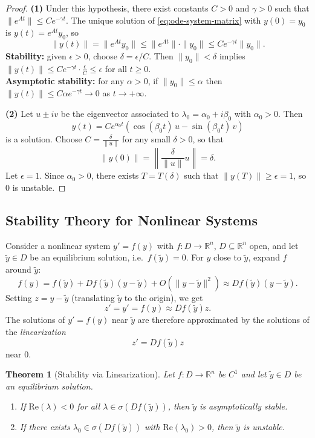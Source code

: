 \documentclass{article}
\newtheorem{theorem}{Theorem}
\newcommand{\R}{\mathbb{R}}
\begin{document}
\begin{proof}
    \textbf{(1)} Under this hypothesis, there exist constants 
    $C > 0$ and $\gamma > 0$ such that $\|e^{At}\| \leq 
    Ce^{-\gamma t}$. The unique solution of 
    \eqref{eq:ode-system-matrix} with $y(0) = y_0$ is 
    $y(t) = e^{At}y_0$, so
    \[\|y(t)\| = \|e^{At}y_0\| \leq \|e^{At}\|\cdot\|y_0\| 
    \leq Ce^{-\gamma t}\|y_0\|.\]
    \textbf{Stability:} given $\epsilon > 0$, choose 
    $\delta = \epsilon/C$. Then $\|y_0\| < \delta$ implies 
    $\|y(t)\| \leq Ce^{-\gamma t}\cdot\frac{\epsilon}{C} \leq 
    \epsilon$ for all $t \geq 0$.\\
    \textbf{Asymptotic stability:} for any $\alpha > 0$, if 
    $\|y_0\| \leq \alpha$ then 
    $\|y(t)\| \leq C\alpha e^{-\gamma t} \to 0$ as $t \to +\infty$.

    \textbf{(2)} Let $u \pm iv$ be the eigenvector associated to 
    $\lambda_0 = \alpha_0 + i\beta_0$ with $\alpha_0 > 0$. Then
    \[y(t) = Ce^{\alpha_0 t}(\cos(\beta_0 t)\,u - 
    \sin(\beta_0 t)\,v)\]
    is a solution. Choose $C = \frac{\delta}{\|u\|}$ for any small 
    $\delta > 0$, so that
    \[\|y(0)\| = \left\|\frac{\delta}{\|u\|}u\right\| = \delta.\]
    Let $\epsilon = 1$. Since $\alpha_0 > 0$, there exists 
    $T = T(\delta)$ such that $\|y(T)\| \geq \epsilon = 1$, 
    so $0$ is unstable.
\end{proof}

\subsection{Stability Theory for Nonlinear Systems}

Consider a nonlinear system $y' = f(y)$ with 
$f : D \to \R^n$, $D \subseteq \R^n$ open, and 
let $\tilde{y} \in D$ be an equilibrium solution, i.e.\ 
$f(\tilde{y}) = 0$. For $y$ close to $\tilde{y}$, expand $f$ 
around $\tilde{y}$:
\[f(y) = f(\tilde{y}) + Df(\tilde{y})(y - \tilde{y}) + 
O(\|y-\tilde{y}\|^2) \approx Df(\tilde{y})(y-\tilde{y}).\]
Setting $z = y - \tilde{y}$ (translating $\tilde{y}$ to the 
origin), we get
\[z' = y' = f(y) \approx Df(\tilde{y})z.\]
The solutions of $y' = f(y)$ near $\tilde{y}$ are therefore 
approximated by the solutions of the \emph{linearization}
\[z' = Df(\tilde{y})z\]
near $0$.

\begin{theorem}[Stability via Linearization]
    Let $f : D \to \R^n$ be $C^1$ and let 
    $\tilde{y} \in D$ be an equilibrium solution.
    \begin{enumerate}
        \item If $\mathrm{Re}(\lambda) < 0$ for all 
        $\lambda \in \sigma(Df(\tilde{y}))$, then $\tilde{y}$ is 
        asymptotically stable.
        \item If there exists $\lambda_0 \in \sigma(Df(\tilde{y}))$ 
        with $\mathrm{Re}(\lambda_0) > 0$, then $\tilde{y}$ is 
        unstable.
    \end{enumerate}
\end{theorem}
\end{document}
